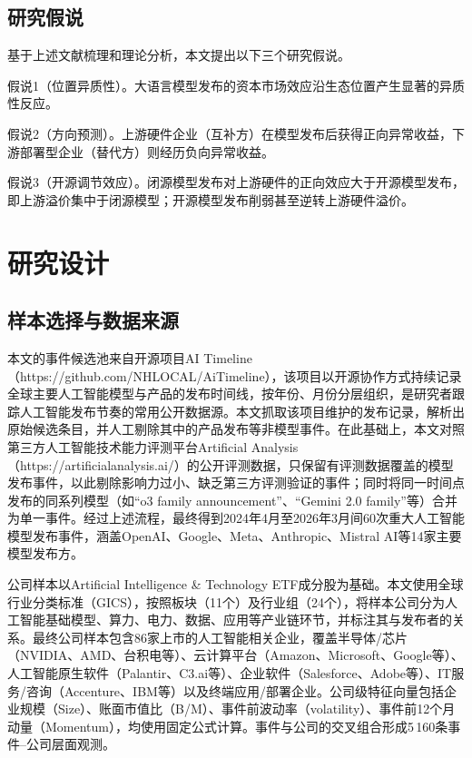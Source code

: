 \documentclass[11pt,fontset=fandol,a4paper]{ctexart}
\newcommand{\changed}[1]{#1}
\begin{document}
\subsection{研究假说}

基于上述文献梳理和理论分析，本文提出以下三个研究假说。

假说1（位置异质性）。大语言模型发布的资本市场效应沿生态位置产生显著的异质性反应。

假说2（方向预测）。上游硬件企业（互补方）在模型发布后获得正向异常收益，下游部署型企业（替代方）则经历负向异常收益。

假说3（开源调节效应）。闭源模型发布对上游硬件的正向效应大于开源模型发布，即上游溢价集中于闭源模型；开源模型发布削弱甚至逆转上游硬件溢价。


\section{研究设计}

\subsection{样本选择与数据来源}

\changed{本文的事件候选池来自开源项目AI Timeline（https://github.com/NHLOCAL/AiTimeline），该项目以开源协作方式持续记录全球主要人工智能模型与产品的发布时间线，按年份、月份分层组织，是研究者跟踪人工智能发布节奏的常用公开数据源。本文抓取该项目维护的发布记录，解析出原始候选条目，并人工剔除其中的产品发布等非模型事件。在此基础上，本文对照第三方人工智能技术能力评测平台Artificial Analysis（https://artificialanalysis.ai/）的公开评测数据，只保留有评测数据覆盖的模型发布事件，以此剔除影响力过小、缺乏第三方评测验证的事件；同时将同一时间点发布的同系列模型（如“o3 family announcement”、“Gemini 2.0 family”等）合并为单一事件。经过上述流程，最终得到2024年4月至2026年3月间60次重大人工智能模型发布事件，涵盖OpenAI、Google、Meta、Anthropic、Mistral AI等14家主要模型发布方。}

公司样本以Artificial Intelligence \& Technology ETF成分股为基础。本文使用全球行业分类标准（GICS），按照板块（11个）及行业组（24个），将样本公司分为人工智能基础模型、算力、电力、数据、应用等产业链环节，并标注其与发布者的关系。最终公司样本包含86家上市的人工智能相关企业，覆盖半导体/芯片（NVIDIA、AMD、台积电等）、云计算平台（Amazon、Microsoft、Google等）、人工智能原生软件（Palantir、C3.ai等）、企业软件（Salesforce、Adobe等）、IT服务/咨询（Accenture、IBM等）以及终端应用/部署企业。公司级特征向量包括企业规模（Size）、账面市值比（B/M）、事件前波动率（volatility）、事件前12个月动量（Momentum），均使用固定公式计算。事件与公司的交叉组合形成5\,160条事件--公司层面观测。
\end{document}
